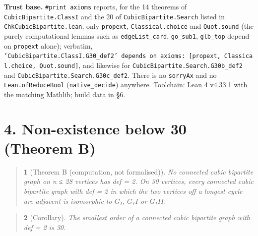 \documentclass[11pt,a4paper]{article}
\theoremstyle{named}
\newtheorem*{namedthm}{}
\begin{document}
\textbf{Trust base.} \texttt{\#print\ \allowbreak{}axioms} reports, for the 14 theorems of \texttt{CubicBipartite.\allowbreak{}ClassI} and the 20 of \texttt{CubicBipartite.\allowbreak{}Search} listed in \texttt{ChkCubicBipartite.\allowbreak{}lean}, only \texttt{propext}, \texttt{Classical.\allowbreak{}choice} and \texttt{Quot.\allowbreak{}sound} (the purely computational lemmas such as \texttt{edgeList\_\allowbreak{}card}, \texttt{go\_\allowbreak{}sub1}, \texttt{glb\_\allowbreak{}top} depend on \texttt{propext} alone); verbatim, \texttt{'CubicBipartite.\allowbreak{}ClassI.\allowbreak{}G30\_\allowbreak{}def2'\ \allowbreak{}depends\ \allowbreak{}on\ \allowbreak{}axioms:\ \allowbreak{}[propext,\ \allowbreak{}Classical.\allowbreak{}choice,\ \allowbreak{}Quot.\allowbreak{}sound]}, and likewise for \texttt{CubicBipartite.\allowbreak{}Search.\allowbreak{}G30b\_\allowbreak{}def2} and \texttt{CubicBipartite.\allowbreak{}Search.\allowbreak{}G30c\_\allowbreak{}def2}. There is no \texttt{sorryAx} and no \texttt{Lean.\allowbreak{}ofReduceBool} (\texttt{native\_\allowbreak{}decide}) anywhere. Toolchain: Lean 4 v4.33.1 with the matching Mathlib; build data in §6.

\section*{4. Non-existence below 30 (Theorem B)}
\begin{quote}
\begin{namedthm}[Theorem B (computation, not formalised)]
No connected cubic bipartite graph on n ≤ 28 vertices has def = 2. On 30 vertices, every connected cubic bipartite graph with def = 2 in which the two vertices off a longest cycle are adjacent is isomorphic to $G_I$, $G_II$ or $G_III$.
\end{namedthm}
\end{quote}
\begin{quote}
\begin{namedthm}[Corollary]
The smallest order of a connected cubic bipartite graph with def = 2 is 30.
\end{namedthm}
\end{quote}
\end{document}
